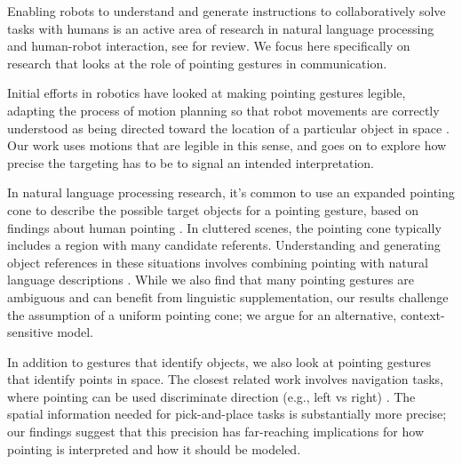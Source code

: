 
Enabling robots to understand and generate instructions to collaboratively solve tasks with humans is an active area of research in natural language processing and human-robot interaction, see \cite{cha2018survey,butepage2017human} for review.   We focus here specifically on research that looks at the role of pointing gestures in communication.

Initial efforts in robotics have looked at making pointing gestures legible, adapting the process of motion planning so that robot movements are correctly understood as being directed toward the location of a particular object in space \cite{holladay2014legible,zhao2016experimental}.  Our work uses motions that are legible in this sense, and goes on to explore how precise the targeting has to be to signal an intended interpretation.

In natural language processing research, it's common to use an expanded pointing cone to describe the possible target objects for a pointing gesture, based on findings about human pointing \cite{kranstedt2003deixis,rieser2004pointing}.  In cluttered scenes, the pointing cone typically includes a region with many candidate referents.  Understanding and generating object references in these situations involves combining pointing with natural language descriptions \cite{han2018placing,kollar2014grounding}.  While we also find that many pointing gestures are ambiguous and can benefit from linguistic supplementation, our results challenge the assumption of a uniform pointing cone; we argue for an alternative, context-sensitive model.

In addition to gestures that identify objects, we also look at pointing gestures that identify points in space.  The closest related work involves navigation tasks, where pointing can be used discriminate direction (e.g., left vs right) \cite{mei2016listen,tellex2011understanding}.  The spatial information needed for pick-and-place tasks is substantially more precise; our findings suggest that this precision has far-reaching implications for how pointing is interpreted and how it should be modeled.





